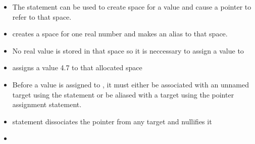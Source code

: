 \documentclass[10pt,t]{beamer}
\begin{document}
\begin{frame}
  \begin{itemize}
    \item The  statement can be used to create space for a value and cause a pointer to refer to that space.
    \item[]  creates a space for one real number and makes  an alias to that space.
    \item No real value is stored in that space so it is neccessary to assign a value to 
    \item {} assigns a value 4.7 to that allocated space
    \item Before a value is assigned to , it must either be associated with an unnamed target using the  statement or be aliased with a target using the pointer assignment statement.
    \item {} statement dissociates the pointer from any target and nullifies it
    \item[] 
  \end{itemize}
\end{frame}
\end{document}
